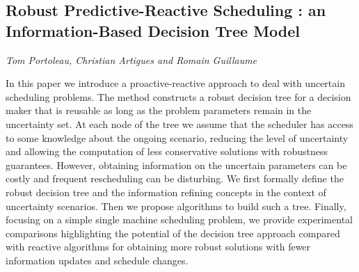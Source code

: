 \documentclass[../booklet.tex]{subfiles}
\begin{document}
\subsection[Robust Predictive-Reactive Scheduling : an Information-Based Decision Tree Model. {\it Tom Portoleau, Christian Artigues and Romain Guillaume}]{Robust Predictive-Reactive Scheduling : an Information-Based Decision Tree Model}
  

\begin{center}
  {\it Tom Portoleau, Christian Artigues and Romain Guillaume}
\end{center}

\vskip 0.8cm


In this paper we introduce a proactive-reactive approach to deal with uncertain scheduling problems. The method constructs a robust decision tree for a decision maker  that is reusable as long as the problem parameters remain in the uncertainty set. At each node of the tree we assume that the scheduler has access to some knowledge about the ongoing scenario, reducing the level of uncertainty and allowing the computation of less conservative solutions with robustness guarantees. However, obtaining information on the uncertain parameters can be costly and frequent rescheduling can be disturbing. 
We first formally define the robust decision tree and the information refining concepts in the context of uncertainty scenarios. Then we propose algorithms to build such a tree. Finally, focusing on a simple single machine scheduling problem, we provide experimental comparisons highlighting the potential of the decision tree approach compared with reactive algorithms for obtaining more robust solutions with fewer information updates and schedule changes.
\end{document}
